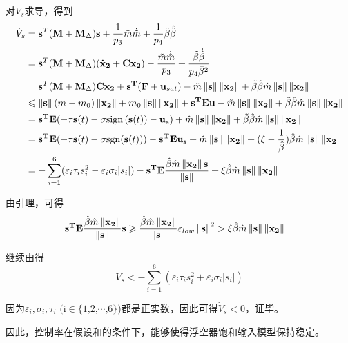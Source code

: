 对$V_s$求导，得到
\begin{align}
    \dot{V}_s &= \mathbf{s}^T(\mathbf{M}+\mathbf{M}_{\Delta})\mathbf{s} + \frac{1}{p_3}\tilde{m}\dot{\tilde{m}}+\frac{1}{p_4}\tilde{\beta}\hat{\tilde{\beta}} \nonumber\\
&=\mathbf{s}^T(\mathbf{M}+\mathbf{M}_{\Delta})\mathbf{(\dot{x}_2+Cx_2)}-\frac{\tilde{m}\dot{\hat{m}}}{p_3}+\frac{\tilde{\beta}\dot{\hat{\beta}}}{p_4\hat{\beta}^2} \nonumber\\
&= \mathbf{s}^T(\mathbf{M}+\mathbf{M}_{\Delta})\mathbf{Cx_2}+\mathbf{s^T}(\mathbf{F}+\mathbf{u}_{sat})-\tilde{m}\left\lVert\mathbf{s}\right\rVert\left\lVert\mathbf{x_2}\right\rVert+\tilde{\beta}\hat{\beta}\hat{m}\left\lVert\mathbf{s}\right\rVert\left\lVert\mathbf{x_2}\right\rVert \nonumber\\
&\leqslant \left\lVert\mathbf{s}\right\rVert(m-m_0)\left\lVert\mathbf{x_2}\right\rVert+m_0\left\lVert\mathbf{s}\right\rVert\left\lVert\mathbf{x_2}\right\rVert+\mathbf{s^TEu}-\tilde{m}\left\lVert\mathbf{s}\right\rVert\left\lVert\mathbf{x_2}\right\rVert+\tilde{\beta}\hat{\beta}\hat{m}\left\lVert\mathbf{s}\right\rVert\left\lVert\mathbf{x_2}\right\rVert \nonumber\\
&=\mathbf{s^TE}(-\tau\mathbf{s}(t)-\sigma \mathrm{sign}\,(\mathbf{s}(t)) - \mathbf{u_s})+\hat{m}\left\lVert\mathbf{s}\right\rVert\left\lVert\mathbf{x_2}\right\rVert+\tilde{\beta}\hat{\beta}\hat{m}\left\lVert\mathbf{s}\right\rVert\left\lVert\mathbf{x_2}\right\rVert \nonumber\\
&= \mathbf{s^TE}(-\tau\mathbf{s}(t)-\sigma \mathrm{sgn}(\mathbf{s}(t)))-\mathbf{s^TEu_s}+\hat{m}\left\lVert\mathbf{s}\right\rVert\left\lVert\mathbf{x_2}\right\rVert+(\xi-\frac{1}{\hat{\beta}})\hat{\beta}\hat{m}\left\lVert\mathbf{s}\right\rVert\left\lVert\mathbf{x_2}\right\rVert \nonumber\\
&=-\sum_{i=1}^6(\varepsilon_i\tau_is_i^2-\varepsilon_i\sigma_i|s_i|)-\mathbf{s^TE}\frac{\hat{\beta}\hat{m}\left\lVert\mathbf{x_2}\right\rVert\mathbf{s}}{\left\lVert\mathbf{s}\right\rVert}+\xi\hat{\beta}\hat{m}\left\lVert\mathbf{s}\right\rVert\left\lVert\mathbf{x_2}\right\rVert \label{eq:lypaad1}
\end{align}

由引理，可得
\begin{align}
    \mathbf{s^TE}\frac{\hat{\beta}\hat{m}\left\lVert\mathbf{x_2}\right\rVert}{\left\lVert\mathbf{s}\right\rVert}\mathbf{s} &\geqslant \frac{\hat{\beta}\hat{m}\left\lVert\mathbf{x_2}\right\rVert}{\left\lVert\mathbf{s}\right\rVert}\varepsilon_{low}\left\lVert\mathbf{s}\right\rVert^2> \xi\hat{\beta}\hat{m}\left\lVert\mathbf{s}\right\rVert\left\lVert\mathbf{x_2}\right\rVert
\end{align}

继续由得
\begin{equation}
    \dot{V}_s<-\sum_{i=1}^6(\varepsilon_i\tau_is_i^2+\varepsilon_i\sigma_i|s_i|)
\end{equation}

因为$\varepsilon_i, \sigma_i, \tau_i\text{  (i$\in$\{1,2,$\cdots$,6\})}$都是正实数，因此可得$\dot{V}_s<0$，证毕。
\vspace{1em}

因此，控制率在假设和的条件下，能够使得浮空器饱和输入模型保持稳定。


